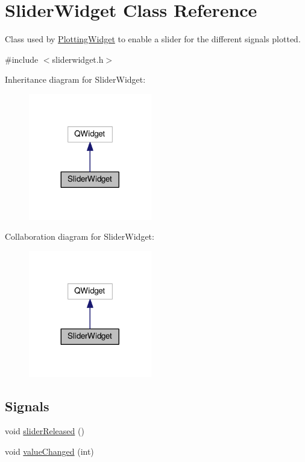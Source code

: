 \hypertarget{classSliderWidget}{}\section{Slider\+Widget Class Reference}
\label{classSliderWidget}


Class used by \hyperlink{classPlottingWidget}{Plotting\+Widget} to enable a slider for the different signals plotted.  




{\ttfamily \#include $<$sliderwidget.\+h$>$}



Inheritance diagram for Slider\+Widget\+:
\nopagebreak
\begin{figure}[H]
\begin{center}
\leavevmode
\includegraphics[width=152pt]{classSliderWidget__inherit__graph}
\end{center}
\end{figure}


Collaboration diagram for Slider\+Widget\+:
\nopagebreak
\begin{figure}[H]
\begin{center}
\leavevmode
\includegraphics[width=152pt]{classSliderWidget__coll__graph}
\end{center}
\end{figure}
\subsection*{Signals}
\begin{DoxyCompactItemize}
\item 
void \hyperlink{classSliderWidget_aa109c6305bc6e78efe3091982e787325}{slider\+Released} ()
\item 
void \hyperlink{classSliderWidget_a23048ce6bec593c2b4d932293b055fa7}{value\+Changed} (int)
\end{DoxyCompactItemize}
